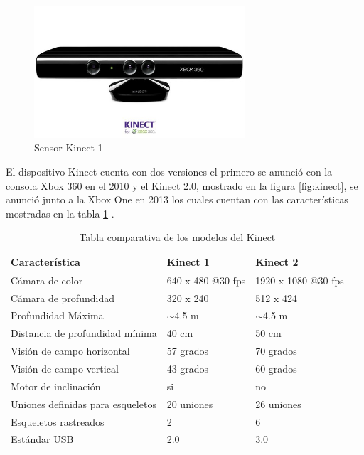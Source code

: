 \begin{figure}[!htb]
	\centering
	\includegraphics[width=0.7\textwidth]{01Introduccion/imagenes/xbox360kinect.JPG}
	\caption{Sensor Kinect 1} 
	\label{fig:kinect1}
\end{figure}

El dispositivo Kinect cuenta con dos versiones el primero se anunció con la consola Xbox 360 en el 2010 y el Kinect 2.0, mostrado en la figura \ref{fig:kinect}, se anunció junto a la Xbox One en 2013 los cuales cuentan con las características mostradas en la tabla \ref{tab:Kinect} \cite{UsodelKi56:online}.\\

\begin{table}[!htb]
	\centering
	\caption{Tabla comparativa de los modelos del Kinect}
	\label{tab:Kinect}
	\begin{tabular}{lll}
		\hline
		Característica                    & Kinect 1          & Kinect 2            \\ \hline
		Cámara de color                   & 640 x 480 @30 fps & 1920 x 1080 @30 fps \\
		Cámara de profundidad             & 320 x 240         & 512 x 424           \\
		Profundidad Máxima                & $\sim$4.5 m       & $\sim$4.5 m         \\
		Distancia de profundidad mínima   & 40 cm             & 50 cm               \\
		Visión de campo horizontal        & 57 grados         & 70 grados           \\
		Visión de campo vertical          & 43 grados         & 60 grados           \\
		Motor de inclinación              & si                & no                  \\
		Uniones definidas para esqueletos & 20 uniones        & 26 uniones          \\
		Esqueletos rastreados             & 2                 & 6                   \\
		Estándar USB                      & 2.0               & 3.0                 \\ \hline
	\end{tabular}%
\end{table}

